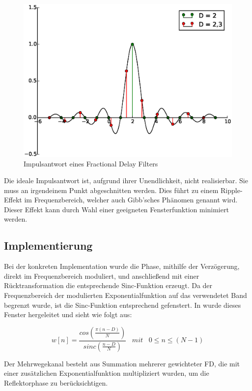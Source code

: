 \begin{figure}[htbp]
	\centering
	\includegraphics[scale=0.5]{images/Sinc}
	\caption{Impulsantwort eines Fractional Delay Filters}
	\label{fig:Sinc}
\end{figure}

Die ideale Impulsantwort ist, aufgrund ihrer Unendlichkeit, nicht realisierbar. Sie muss an irgendeinem Punkt abgeschnitten werden. Dies führt zu einem Ripple-Effekt im Frequenzbereich, welcher auch Gibb'sches Phänomen genannt wird. Dieser Effekt kann durch Wahl einer geeigneten Fensterfunktion minimiert werden.

\subsection{Implementierung}
Bei der konkreten Implementation wurde die Phase, mithilfe der Verzögerung, direkt im Frequenzbereich moduliert, und anschließend mit einer Rücktransformation die entsprechende Sinc-Funktion erzeugt. Da der Frequenzbereich der modulierten Exponentialfunktion auf das verwendetet Band begrenzt wurde, ist die Sinc-Funktion entsprechend gefenstert. In \cite{fd-filter} wurde dieses Fenster hergeleitet und sieht wie folgt aus:

\begin{equation}
	\label{eq:fd-window}
	w[n] = \frac{cos\left(\frac{\pi (n-D)}{N}\right)}{sinc\left(\frac{n-D}{N}\right)}  \;\;\; mit \;\;\; 0 \leq n \leq (N-1)
\end{equation}

Der Mehrwegekanal besteht aus Summation mehrerer gewichteter \gls{FD}, die mit einer zusätzlichen Exponentialfunktion multipliziert wurden, um die Reflektorphase zu berücksichtigen.  




 
